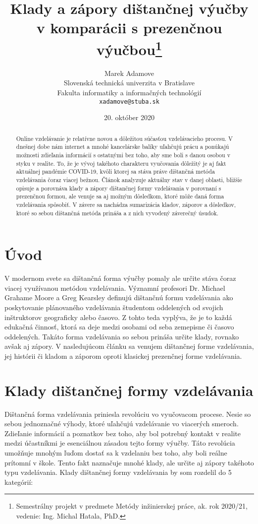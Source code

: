 \documentclass[10pt,slovak,a4paper]{article}
\title{Klady a zápory dištančnej výučby v komparácii s prezenčnou výučbou\thanks{Semestrálny projekt v predmete Metódy inžinierskej práce, ak. rok 2020/21, vedenie: Ing. Michal Hatala, PhD.}}
\author{Marek Adamove\\[2pt]
	{\small Slovenská technická univerzita v Bratislave}\\
	{\small Fakulta informatiky a informačných technológií}\\
	{\small \texttt{xadamove@stuba.sk}}
	}
\date{\small 20. október 2020}
\begin{document}
\maketitle

\begin{abstract}
Online vzdelávanie je relatívne novou a dôležitou súčasťou vzdelávacieho procesu. V dnešnej
dobe nám internet a mnohé kancelárske balíky uľahčujú prácu a ponúkajú možnosti zdieľania informácií
s ostatnými bez toho, aby sme boli s danou osobou v styku v realite. To, že je vývoj takéhoto charakteru vyučovania dôležitý je aj fakt aktuálnej pandémie COVID-19, kvôli ktorej sa stáva práve dištančná metóda vzdelávania čoraz viacej bežnou. Článok analyzuje aktuálny stav v danej oblasti, bližšie opisuje a porovnáva klady a zápory dištančnej formy vzdelávania v porovnaní s prezenčnou formou, ale venuje sa aj možným dôsledkom, ktoré môže daná forma vzdelávania spôsobiť. V závere sa nachádza sumarizácia kladov, záporov a dôsledkov, ktoré so sebou dištančná metóda prináša a z nich vyvodený záverečný úsudok.
\end{abstract}



\section{Úvod}

	V modernom svete sa dištančná forma výučby pomaly ale určite stáva čoraz viacej využívanou metódou vzdelávania. Významní profesori Dr. Michael Grahame Moore a Greg Kearsley definujú dištančnú formu vzdelávania ako poskytovanie plánovaného vzdelávania študentom oddelených od svojich inštruktorov geograficky alebo časovo.\cite{moore_kearsley_2012} Z tohto teda vyplýva, že je to každá edukačná činnosť, ktorá sa deje medzi osobami od seba zemepisne či časovo oddelených. Takáto forma vzdelávania so sebou prináša určite klady, rovnako avšak aj zápory. V nasledujúcom článku sa venujem dištančnej forme vzdelávania, jej histórii či kladom a záporom oproti klasickej prezenčnej forme vzdelávania.




\section{Klady dištančnej formy vzdelávania}
	Dištančná forma vzdelávania priniesla revolúciu vo vyučovacom procese. Nesie so sebou jednoznačné výhody, ktoré uľahčujú vzdelávanie vo viacerých smeroch. Zdieľanie informácií a poznatkov bez toho, aby bol potrebný kontakt v realite medzi účastníkmi je esenciálnou zásadou tejto formy výučby. Táto revolúcia umožňuje mnohým ľuďom dostať sa k vzdelaniu bez toho, aby boli reálne prítomní v škole. Tento fakt naznačuje mnohé klady, ale určite aj zápory takéhoto typu vzdelávania. Klady dištančnej formy vzdelávania by som rozdelil do 5 kategórií:
\end{document}
